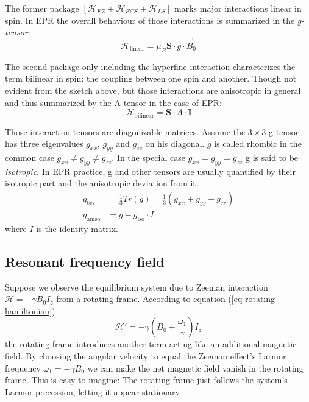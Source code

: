 \documentclass[11.5pt,a4paper]{article}
\begin{document}
  The former package $\left[\mathcal{H}_{EZ} + \mathcal{H}_{ECS} + \mathcal{H}_{LS}\right]$ marks major interactions linear in spin. In EPR the overall behaviour of those interactions is summarized in the \emph{g-tensor}:
  \begin{equation}
    \mathcal{H}_\text{linear} = \mu_B \mathbf{S} \cdot g \cdot \vec{B}_0
  \end{equation}

  The second package only including the hyperfine interaction characterizes the term bilinear in spin: the coupling between one spin and another. Though not evident from the sketch above, but those interactions are anisotropic in general and thus summarized by the A-tensor in the case of EPR:
  \begin{equation}
    \mathcal{H}_\text{bilinear} = \mathbf{S} \cdot A \cdot \mathbf{I}
  \end{equation}

  Those interaction tensors are diagonizable matrices. Assume the $3 \times 3$ g-tensor has three eigenvalues $g_{xx}$, $g_{yy}$ and $g_{zz}$ on his diagonal. $g$ is called rhombic in the common case $g_{xx} \neq g_{yy} \neq g_{zz}$. In the special case $g_{xx} = g_{yy} = g_{zz}$ g is said to be \emph{isotropic}. In EPR practice, g and other tensors are usually quantified by their isotropic part and the anisotropic deviation from it:
\begin{align}
 g_\text{iso} & = \frac{1}{3} Tr(g) = \frac{1}{3} (g_{xx} + g_{yy} + g_{zz})\\
 g_\text{aniso} & = g - g_\text{iso} \cdot I
\end{align}
where $I$ is the identity matrix.


\subsection{Resonant frequency field}
Suppose we observe the equilibrium system due to Zeeman interaction $\mathcal{H} = - \gamma B_0 I_z$ from a rotating frame. According to equation (\ref{eq-rotating-hamiltonian})
\begin{equation}
  \mathcal{H'} = -\gamma(B_0 + \frac{\omega_1}{\gamma}) I_z
\end{equation}
the rotating frame introduces another term acting like an additional magnetic field. By choosing the angular velocity to equal the Zeeman effect's Larmor frequency $\omega_1 = -\gamma B_0$ we can make the net magnetic field vanish in the rotating frame. This is easy to imagine: The rotating frame just follows the system's Larmor precession, letting it appear stationary.
\end{document}
